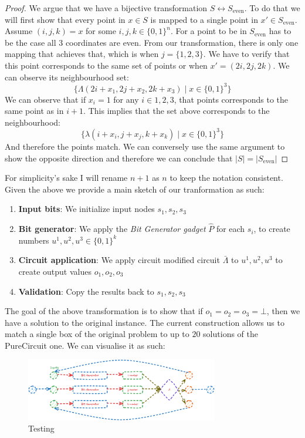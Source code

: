 \begin{proof}
    We argue that we have a bijective transformation $S \leftrightarrow S_{\text{even}}$. To do that we will
    first show that every point in $x \in S$ is mapped to a single point in $x' \in S_{\text{even}}$.
    Assume $(i,j,k) = x$ for some $i,j,k \in \{0,1\}^{n}$. For a point to be in $S_{\text{even}}$
    has to be the case all 3 coordinates are even. From our transformation, there is only one mapping
    that achieves that, which is when $j = \{1,2,3\}$. We have to verify that this point corresponds to the
    same set of points or when $x' = (2i , 2j, 2k)$. We can observe its neighbourhood set:
    $$
    \Big\{\Lambda(2i + x_1, 2j + x_2, 2k + x_3) \mid x \in \{0,1\}^3 \Big\}
    $$
    We can observe that if $x_i = 1$ for any $i \in {1,2,3}$, that points
    corresponds to the same point as in $i + 1$. This implies that the set above
    corresponds to the neighbourhood:
    $$
    \Big\{\lambda(i + x_i, j + x_j, k + x_k) \mid x \in \{0,1\}^3 \Big\}
    $$
    And therefore the points match. We can conversely use the same argument to show the opposite
    direction and therefore we can conclude that $|S| = |S_{\text{even}}|$
\end{proof}
For simplicity's sake I will rename $n + 1$ as $n$ to keep the notation consistent.
Given the above we provide a main sketch of our tranformation as such:
\begin{enumerate}
    \item \textbf{Input bits}: We initialize input nodes $s_1, s_2, s_3$
    \item \textbf{Bit generator}: We apply the \textit{Bit Generator gadget} $\hat{P}$ for each $s_i$,
        to create numbers $u^1, u^2, u^3 \in \{0,1\}^{k}$
    \item \textbf{Circuit application}: We apply circuit modified circuit $\bar{\Lambda}$ to $u^1, u^2, u^3$ to create output values $o_1, o_2, o_3$
    \item \textbf{Validation}: Copy the results back to $s_1, s_2, s_3$
\end{enumerate}

The goal of the above transformation is to show that if $o_1 = o_2 =o_3 = \bot$, then we have a solution
to the original instance. The current construction allows us to match a single box of the original problem to
up to $20$ solutions of the PureCircuit one. We can visualise it as such:


\begin{figure}[h!]
    \centering
    \includegraphics[width=0.75\textwidth]{assets/reduction_sketch.png}
    \caption{Testing}
    \label{fig:main-proof:visualisation}
\end{figure}


